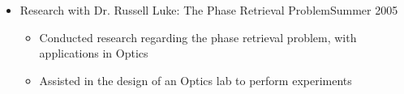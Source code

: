 \documentclass[10pt]{article}
\newenvironment{myitem}{
\begin{itemize}
  \setlength{\itemsep}{1pt}
  \setlength{\parskip}{0pt}
  \setlength{\parsep}{0pt}
}{\end{itemize}}
\begin{document}
\begin{myitem}
\begin{myitem}
  \item Worked towards validating the custom code by comparing simulations
 \end{myitem}
%
%
\item Research with Dr. Russell Luke: The Phase Retrieval Problem\hfill Summer 2005
 \begin{myitem}
  \item Conducted research regarding the phase retrieval problem, with applications in Optics
  \item Assisted in the design of an Optics lab to perform experiments
 \end{myitem}
%
%
%
\end{myitem}
%
\vspace{-.55cm}
\end{document}
